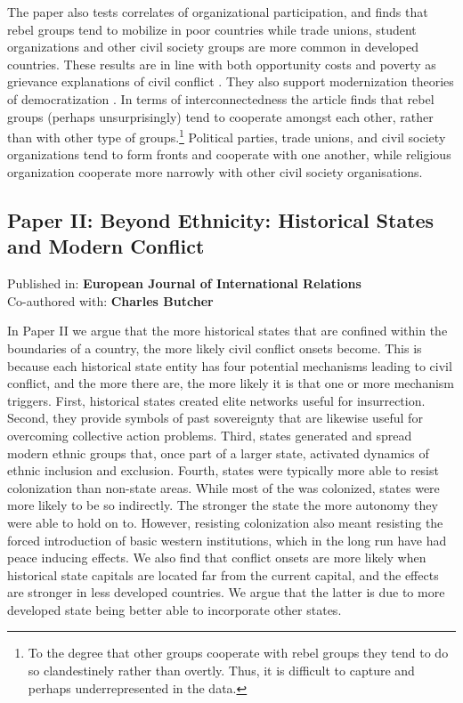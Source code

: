 The paper also tests correlates of organizational participation, and finds that
rebel groups tend to mobilize in poor countries while trade unions, student
organizations and other civil society groups are more common in developed
countries. These results are in line with both opportunity costs and poverty as
grievance explanations of civil conflict \citep{Collier2009, Davies_1962,
GurrTedRobert1970Wmr}. They also support modernization theories of
democratization \citep{Butcher_2014, Dahlum2019}. In terms of interconnectedness
the article finds that rebel groups (perhaps unsurprisingly) tend to cooperate
amongst each other, rather than with other type of groups.\footnote{To the
degree that other groups cooperate with rebel groups they tend to do so
clandestinely rather than overtly. Thus, it is difficult to capture and perhaps
underrepresented in the data.} Political parties, trade unions, and civil
society organizations tend to form fronts and cooperate with one another, while
religious organization cooperate more narrowly with other civil society
organisations.

\subsection{Paper II: Beyond Ethnicity: Historical States and Modern Conflict}
\label{Paper 2}

Published in: \textbf{European Journal of International Relations}\\
Co-authored with: \textbf{Charles Butcher}

In Paper II we argue that the more historical states that are confined within
the boundaries of a country, the more likely civil conflict onsets become. This
is because each historical state entity has four potential mechanisms leading to
civil conflict, and the more there are, the more likely it is that one or more
mechanism triggers. First, historical states created elite networks useful for
insurrection. Second, they provide symbols of past sovereignty that are likewise
useful for overcoming collective action problems. Third, states generated and
spread modern ethnic groups that, once part of a larger state, activated
dynamics of ethnic inclusion and exclusion. Fourth, states were typically more
able to resist colonization than non-state areas. While most of the was
colonized, states were more likely to be so indirectly. The stronger the state
the more autonomy they were able to hold on to. However, resisting colonization
also meant resisting the forced introduction of basic western institutions,
which in the long run have had peace inducing effects. We also find that
conflict onsets are more likely when historical state capitals are located far
from the current capital, and the effects are stronger in less developed
countries. We argue that the latter is due to more developed state being better
able to incorporate other states.

